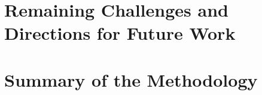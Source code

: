 \section{Remaining Challenges and Directions for Future Work}

\section{Summary of the Methodology}
